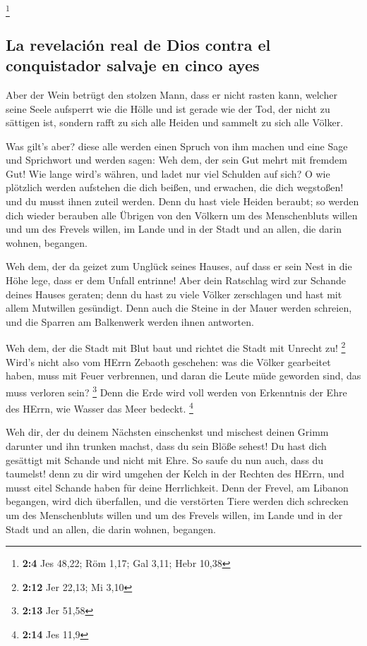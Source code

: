 \footnote{\textbf{2:4} Jes 48,22; Röm 1,17; Gal 3,11; Hebr 10,38}

\hypertarget{la-revelaciuxf3n-real-de-dios-contra-el-conquistador-salvaje-en-cinco-ayes}{%
\subsection{La revelación real de Dios contra el conquistador salvaje en
cinco
ayes}\label{la-revelaciuxf3n-real-de-dios-contra-el-conquistador-salvaje-en-cinco-ayes}}

 Aber der Wein betrügt den stolzen Mann, dass er nicht
rasten kann, welcher seine Seele aufsperrt wie die Hölle und ist gerade
wie der Tod, der nicht zu sättigen ist, sondern rafft zu sich alle
Heiden und sammelt zu sich alle Völker.

 Was gilt's aber? diese alle werden einen Spruch von ihm
machen und eine Sage und Sprichwort und werden sagen: Weh dem, der sein
Gut mehrt mit fremdem Gut! Wie lange wird's währen, und ladet nur viel
Schulden auf sich?  O wie plötzlich werden aufstehen die
dich beißen, und erwachen, die dich wegstoßen! und du musst ihnen zuteil
werden.  Denn du hast viele Heiden beraubt; so werden dich
wieder berauben alle Übrigen von den Völkern um des Menschenbluts willen
und um des Frevels willen, im Lande und in der Stadt und an allen, die
darin wohnen, begangen.

 Weh dem, der da geizet zum Unglück seines Hauses, auf
dass er sein Nest in die Höhe lege, dass er dem Unfall entrinne!
 Aber dein Ratschlag wird zur Schande deines Hauses
geraten; denn du hast zu viele Völker zerschlagen und hast mit allem
Mutwillen gesündigt.  Denn auch die Steine in der Mauer
werden schreien, und die Sparren am Balkenwerk werden ihnen antworten.

 Weh dem, der die Stadt mit Blut baut und richtet die
Stadt mit Unrecht zu! \footnote{\textbf{2:12} Jer 22,13; Mi 3,10}
 Wird's nicht also vom HErrn Zebaoth geschehen: was die
Völker gearbeitet haben, muss mit Feuer verbrennen, und daran die Leute
müde geworden sind, das muss verloren sein? \footnote{\textbf{2:13} Jer
  51,58}  Denn die Erde wird voll werden von Erkenntnis
der Ehre des HErrn, wie Wasser das Meer bedeckt. \footnote{\textbf{2:14}
  Jes 11,9}

 Weh dir, der du deinem Nächsten einschenkst und mischest
deinen Grimm darunter und ihn trunken machst, dass du sein Blöße sehest!
 Du hast dich gesättigt mit Schande und nicht mit Ehre.
So saufe du nun auch, dass du taumelst! denn zu dir wird umgehen der
Kelch in der Rechten des HErrn, und musst eitel Schande haben für deine
Herrlichkeit.  Denn der Frevel, am Libanon begangen, wird
dich überfallen, und die verstörten Tiere werden dich schrecken um des
Menschenbluts willen und um des Frevels willen, im Lande und in der
Stadt und an allen, die darin wohnen, begangen.

